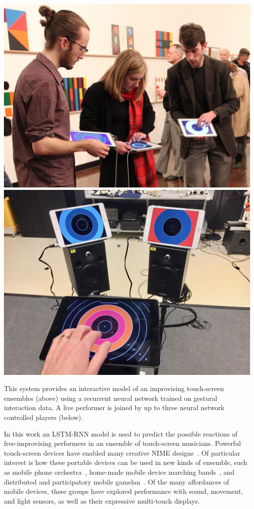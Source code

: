 \documentclass[sigchi-a, authorversion]{acmart}
\begin{document}
\begin{marginfigure}
    \includegraphics[width=\marginparwidth]{touch-screen-ensemble}
    \includegraphics[width=\marginparwidth]{neural-touch-screen-band-small}
    \caption{This system provides an interactive model of an
      improvising touch-screen ensembles (above) using a recurrent neural
      network trained on gestural interaction data. A live performer
      is joined by up to three neural network controlled players (below).}
    \label{fig:system-demo}
\end{marginfigure}

In this work an LSTM-RNN model is used to predict the possible
reactions of free-improvising performers in an ensemble of
touch-screen musicians. Powerful touch-screen devices have enabled
many creative NIME designs~\cite{Gaye:2006qy}. Of particular interest
is how these portable devices can be used in new kinds of ensemble,
such as mobile phone orchestra~\cite{Wang:2014cs}, home-made mobile
device marching bands~\cite{Snyder:2014dp}, and distributed and
participatory mobile gamelan~\cite{Greg-Schiemer:2007mz}. Of the many
affordances of mobile devices\cite{Tanaka:2010sp}, these groups have
explored performance with sound, movement, and light sensors, as well
as their expressive multi-touch displays.
\end{document}
